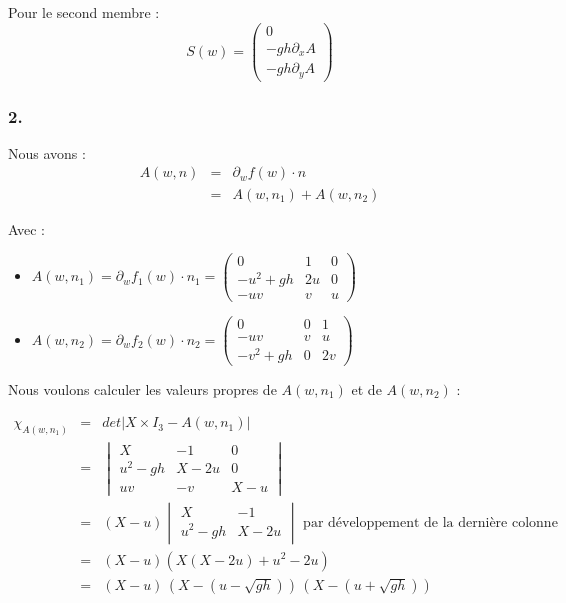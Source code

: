 \documentclass{article}
\begin{document}
Pour le second membre :
\[ S(w) = \begin{pmatrix} 0 \\ -gh \partial_x A \\ -gh \partial_y A \end{pmatrix} \]

\subsubsection*{2.}

Nous avons :
\begin{eqnarray*}
	A(w, n) &=& \partial_w f(w) \cdot n \\
		&=& A(w, n_1) + A(w,n_2)
\end{eqnarray*}

Avec :
\begin{itemize}
	\item $A(w, n_1) = \partial_w f_1(w) \cdot n_1 = \begin{pmatrix} 0 & 1 & 0 \\ -u^2+gh & 2u & 0 \\ -uv & v & u \end{pmatrix}$
	\item $A(w, n_2) = \partial_w f_2(w) \cdot n_2 = \begin{pmatrix} 0 & 0 & 1 \\ -uv & v & u \\ -v^2+gh & 0 & 2v \end{pmatrix}$
\end{itemize}

Nous voulons calculer les valeurs propres de $A(w, n_1)$ et de $A(w, n_2)$ :

\begin{eqnarray*}
	\chi_{A(w, n_1)} &=& det |X \times I_3 - A(w,n_1)| \\
	&=& \begin{vmatrix} X & -1 & 0 \\ u^2-gh & X-2u & 0 \\ uv & -v & X-u \end{vmatrix} \\
	&=& (X-u) \begin{vmatrix} X & -1 \\ u^2-gh & X-2u \end{vmatrix} \text{ par développement de la dernière colonne} \\
	&=& (X-u) \left( X(X-2u) + u^2-2u \right) \\
	&=& (X-u) \, (X - (u-\sqrt{gh})) \, (X - (u+\sqrt{gh}))
\end{eqnarray*}
\end{document}

